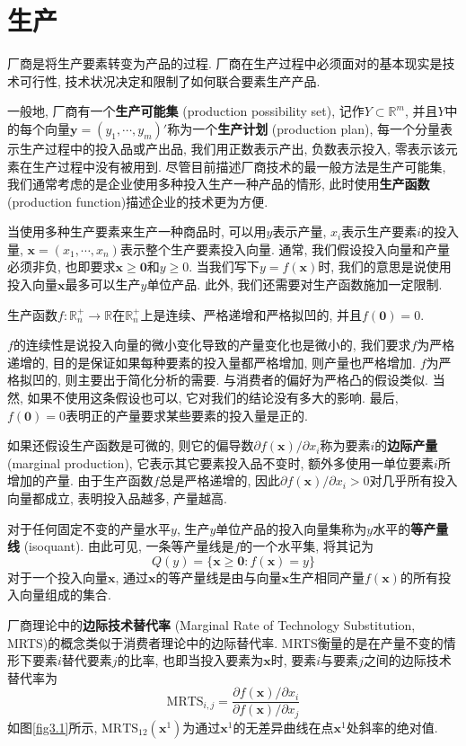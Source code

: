 \documentclass[cn, 12pt, math=mtpro2, bibstyle=apa, blue]{elegantbook}
\newcommand{\R}{\mathbb{R}}
\newcommand{\x}{\mathbf{x}}
\begin{document}
\section{生产}
厂商是将生产要素转变为产品的过程. 厂商在生产过程中必须面对的基本现实是技术可行性, 技术状况决定和限制了如何联合要素生产产品. 

一般地, 厂商有一个\textbf{生产可能集} (production possibility set), 记作$Y\subset\R^m$, 并且$Y$中的每个向量$\mathbold{y}=(y_1,\cdots,y_m)'$称为一个\textbf{生产计划} (production plan), 每一个分量表示生产过程中的投入品或产出品, 我们用正数表示产出, 负数表示投入, 零表示该元素在生产过程中没有被用到. 尽管目前描述厂商技术的最一般方法是生产可能集, 我们通常考虑的是企业使用多种投入生产一种产品的情形, 此时使用\textbf{生产函数} (production function)描述企业的技术更为方便.

当使用多种生产要素来生产一种商品时, 可以用$y$表示产量, $x_i$表示生产要素$i$的投入量, $\x=(x_1,\cdots,x_n)$表示整个生产要素投入向量. 通常, 我们假设投入向量和产量必须非负, 也即要求$\x\ge \mathbf{0}$和$y\ge0$. 当我们写下$y=f(\x)$时, 我们的意思是说使用投入向量$\x$最多可以生产$y$单位产品. 此外, 我们还需要对生产函数施加一定限制.

\begin{definition}[生产函数]\label{def:def3.1}
生产函数$f:\R_n^+\to\R$在$\R_n^+$上是连续、严格递增和严格拟凹的, 并且$f(\mathbf{0})=0$.
\end{definition}

$f$的连续性是说投入向量的微小变化导致的产量变化也是微小的, 我们要求$f$为严格递增的, 目的是保证如果每种要素的投入量都严格增加, 则产量也严格增加. $f$为严格拟凹的, 则主要出于简化分析的需要. 与消费者的偏好为严格凸的假设类似. 当然, 如果不使用这条假设也可以, 它对我们的结论没有多大的影响. 最后, $f(\mathbf{0})=0$表明正的产量要求某些要素的投入量是正的. 

如果还假设生产函数是可微的, 则它的偏导数$\partial f(\x)/\partial x_i$称为要素$i$的\textbf{边际产量} (marginal production), 它表示其它要素投入品不变时, 额外多使用一单位要素$i$所增加的产量. 由于生产函数$f$总是严格递增的, 因此$\partial f(\x)/\partial x_i>0$对几乎所有投入向量都成立, 表明投入品越多, 产量越高.

对于任何固定不变的产量水平$y$, 生产$y$单位产品的投入向量集称为$y$水平的\textbf{等产量线} (isoquant). 由此可见, 一条等产量线是$f$的一个水平集, 将其记为
$$Q(y)=\{\x\ge\mathbf{0}:f(\x)=y\}$$
对于一个投入向量$\x$, 通过$\x$的等产量线是由与向量$\x$生产相同产量$f(\x)$的所有投入向量组成的集合.

厂商理论中的\textbf{边际技术替代率} (Marginal Rate of Technology Substitution, MRTS)的概念类似于消费者理论中的边际替代率. MRTS衡量的是在产量不变的情形下要素$i$替代要素$j$的比率, 也即当投入要素为$\x$时, 要素$i$与要素$j$之间的边际技术替代率为
$$\text{MRTS}_{i,j}=\frac{\partial f(\x)/\partial x_i}{\partial f(\x)/\partial x_j}$$
如图\ref{fig3.1}所示, $\text{MRTS}_{12}(\x^1)$为通过$\x^1$的无差异曲线在点$\x^1$处斜率的绝对值.
\end{document}
